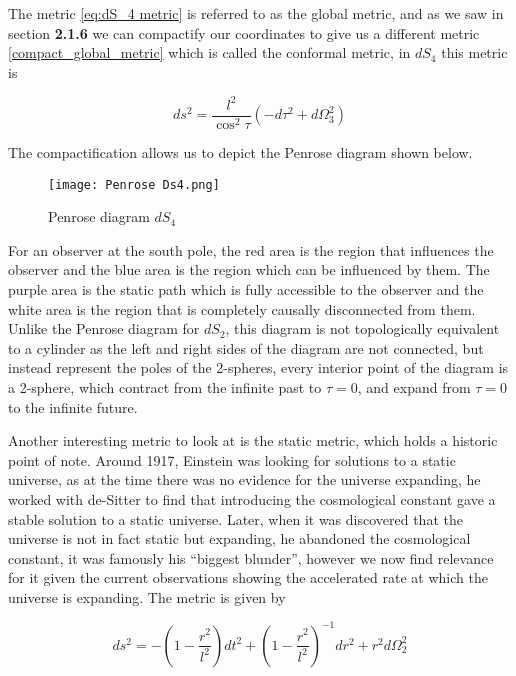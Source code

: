 \documentclass[a4paper,11pt]{article}
\numberwithin{equation}{section}
\numberwithin{figure}{section}
\begin{document}
\begin{large}
The metric \eqref{eq:dS_4 metric} is referred to as the global metric, and as we saw in section \textbf{2.1.6} we can compactify our coordinates to give us a different metric \eqref{compact_global_metric} which is called the conformal metric, in $dS_4$ this metric is 

\begin{equation}
\label{eq:conformal metric}
    ds^2=\frac{l^2}{\cos^2\tau}(-d\tau^2+d\Omega^2_3)
\end{equation}

\vspace{0.5cm}

The compactification allows us to depict the Penrose diagram shown below.

\begin{figure}[h]
    \centering
    \texttt{[image: Penrose Ds4.png]}
    \caption{Penrose diagram $dS_4$}
    \label{fig:penrose_dS4}
    
\end{figure}

For an observer at the south pole, the red area is the region that influences the observer and the blue area is the region which can be influenced by them. The purple area is the static path which is fully accessible to the observer and the white area is the region that is completely causally disconnected from them. Unlike the Penrose diagram for $dS_2$, this diagram is not topologically equivalent to a cylinder as the left and right sides of the diagram are not connected, but instead represent the poles of the 2-spheres, every interior point of the diagram is a 2-sphere, which contract from the infinite past to $\tau=0$, and expand from $\tau=0$ to the infinite future.



Another interesting metric to look at is the static metric, which holds a historic point of note. Around 1917, Einstein was looking for solutions to a static universe, as at the time there was no evidence for the universe expanding, he worked with de-Sitter to find that introducing the cosmological constant gave a stable solution to a static universe. Later, when it was discovered that the universe is not in fact static but expanding, he abandoned the cosmological constant, it was famously his ``biggest blunder'', however we now find relevance for it given the current observations showing the accelerated rate at which the universe is expanding. The metric is given by

\begin{equation}
\label{eq:static metric}
    ds^2=-\left(1-\frac{r^2}{l^2}\right)dt^2+\left(1-\frac{r^2}{l^2}\right)^{-1}dr^2+r^2d\Omega_2^2
\end{equation}



\end{large}
\end{document}
